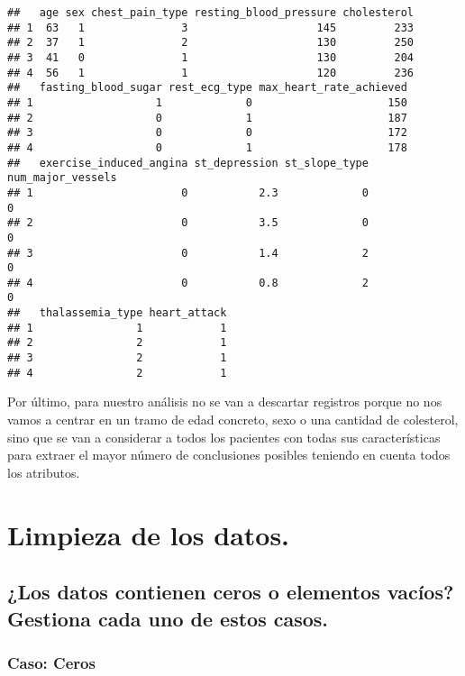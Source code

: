 \documentclass[
]{article}
\begin{document}
\begin{verbatim}
##   age sex chest_pain_type resting_blood_pressure cholesterol
## 1  63   1               3                    145         233
## 2  37   1               2                    130         250
## 3  41   0               1                    130         204
## 4  56   1               1                    120         236
##   fasting_blood_sugar rest_ecg_type max_heart_rate_achieved
## 1                   1             0                     150
## 2                   0             1                     187
## 3                   0             0                     172
## 4                   0             1                     178
##   exercise_induced_angina st_depression st_slope_type num_major_vessels
## 1                       0           2.3             0                 0
## 2                       0           3.5             0                 0
## 3                       0           1.4             2                 0
## 4                       0           0.8             2                 0
##   thalassemia_type heart_attack
## 1                1            1
## 2                2            1
## 3                2            1
## 4                2            1
\end{verbatim}

Por último, para nuestro análisis no se van a descartar registros porque
no nos vamos a centrar en un tramo de edad concreto, sexo o una cantidad
de colesterol, sino que se van a considerar a todos los pacientes con
todas sus características para extraer el mayor número de conclusiones
posibles teniendo en cuenta todos los atributos.

\hypertarget{limpieza-de-los-datos.}{%
\section{Limpieza de los datos.}\label{limpieza-de-los-datos.}}

\hypertarget{los-datos-contienen-ceros-o-elementos-vacuxedos-gestiona-cada-uno-de-estos-casos.}{%
\subsection{¿Los datos contienen ceros o elementos vacíos? Gestiona cada
uno de estos
casos.}\label{los-datos-contienen-ceros-o-elementos-vacuxedos-gestiona-cada-uno-de-estos-casos.}}

\hypertarget{caso-ceros}{%
\subsubsection{Caso: Ceros}\label{caso-ceros}}
\end{document}
